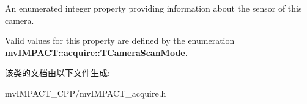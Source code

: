 An enumerated integer property providing information about the sensor of this camera. 

Valid values for this property are defined by the enumeration {\bfseries mv\+I\+M\+P\+A\+C\+T\+::acquire\+::\+T\+Camera\+Scan\+Mode}. 

该类的文档由以下文件生成\+:\begin{DoxyCompactItemize}
\item 
mv\+I\+M\+P\+A\+C\+T\+\_\+\+C\+P\+P/mv\+I\+M\+P\+A\+C\+T\+\_\+acquire.\+h\end{DoxyCompactItemize}
